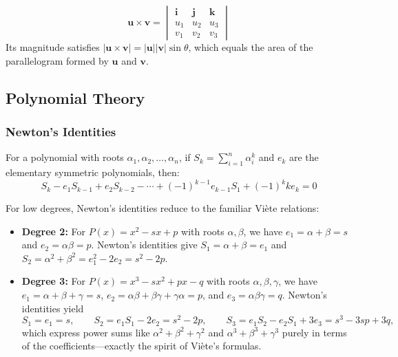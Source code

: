 \documentclass[12pt]{article}
\begin{document}
\[\mathbf{u} \times \mathbf{v} = \begin{vmatrix} \mathbf{i} & \mathbf{j} & \mathbf{k} \\ u_1 & u_2 & u_3 \\ v_1 & v_2 & v_3 \end{vmatrix}\]
Its magnitude satisfies $|\mathbf{u} \times \mathbf{v}| = |\mathbf{u}||\mathbf{v}|\sin\theta$, which equals the area of the parallelogram formed by $\mathbf{u}$ and $\mathbf{v}$.

\subsection{Polynomial Theory}
\subsubsection{Newton's Identities}
\begin{theorem}
For a polynomial with roots $\alpha_1, \alpha_2, \ldots, \alpha_n$, if $S_k = \sum_{i=1}^n \alpha_i^k$ and $e_k$ are the elementary symmetric polynomials, then:
\[S_k - e_1 S_{k-1} + e_2 S_{k-2} - \cdots + (-1)^{k-1} e_{k-1} S_1 + (-1)^k k e_k = 0\]
\end{theorem}

\begin{remark}
For low degrees, Newton's identities reduce to the familiar Viète relations:
\begin{itemize}[leftmargin=*]
  \item \textbf{Degree 2:} For $P(x) = x^2 - sx + p$ with roots $\alpha,\beta$, we have $e_1 = \alpha+\beta = s$ and $e_2 = \alpha\beta = p$. Newton's identities give $S_1 = \alpha+\beta = e_1$ and $S_2 = \alpha^2+\beta^2 = e_1^2 - 2e_2 = s^2 - 2p$.
  \item \textbf{Degree 3:} For $P(x) = x^3 - sx^2 + px - q$ with roots $\alpha,\beta,\gamma$, we have $e_1 = \alpha+\beta+\gamma = s$, $e_2 = \alpha\beta+\beta\gamma+\gamma\alpha = p$, and $e_3 = \alpha\beta\gamma = q$. Newton's identities yield
  \[
    S_1 = e_1 = s,\qquad
    S_2 = e_1 S_1 - 2e_2 = s^2 - 2p,\qquad
    S_3 = e_1 S_2 - e_2 S_1 + 3e_3 = s^3 - 3sp + 3q,
  \]
  which express power sums like $\alpha^2+\beta^2+\gamma^2$ and $\alpha^3+\beta^3+\gamma^3$ purely in terms of the coefficients—exactly the spirit of Viète's formulas.
\end{itemize}
\end{remark}
\end{document}
